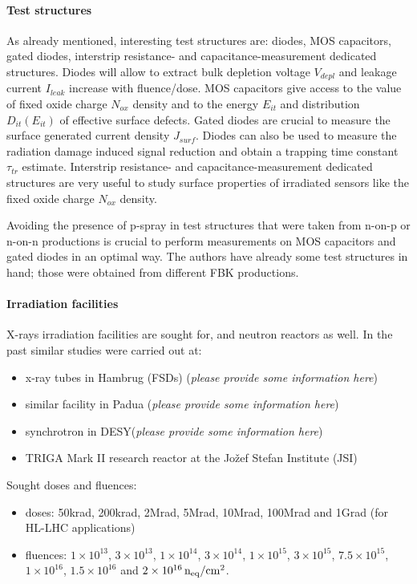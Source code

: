 \documentclass[dvips,12pt]{article}
\begin{document}
\paragraph{Test structures} As already mentioned, interesting test structures are: diodes, MOS 
capacitors, gated diodes, interstrip resistance- and 
capacitance-measurement dedicated structures.
Diodes will allow to extract bulk depletion voltage $V_{depl}$ and leakage current $I_{leak}$
 increase with fluence/dose. 
MOS capacitors give access to the value of fixed oxide charge $N_{ox}$ density and to the energy 
 $E_{it}$ and distribution  $D_{it}(E_{it})$ of effective surface defects. Gated diodes 
are crucial to measure the surface generated current density $J_{surf}$. 
Diodes can also be used to measure the radiation damage induced signal reduction and obtain 
a trapping time constant $\tau_{tr}$ estimate. Interstrip resistance- and 
capacitance-measurement dedicated structures are very useful to study surface properties 
of irradiated sensors like the fixed oxide charge $N_{ox}$ density.

\noindent Avoiding the presence of p-spray in test structures that were taken from
 n-on-p or n-on-n productions is crucial to perform measurements on MOS 
capacitors and gated diodes in an optimal way.
\noindent The authors have already some test structures in hand; those  were obtained from different 
FBK productions. 

\paragraph{Irradiation facilities}
X-rays irradiation facilities are sought for, and neutron reactors as well.
In the past similar studies were carried out at:
\begin{itemize}
\item x-ray tubes in Hambrug (FSDs) ({\it please provide some information here})
\item similar facility in Padua ({\it please provide some information here})
\item synchrotron in DESY({\it please provide some information here})
\item TRIGA Mark II research reactor at the Jo\v{z}ef Stefan Institute (JSI)  
\end{itemize}
\noindent Sought doses and fluences:
\begin{itemize}
\item doses: 50krad, 200krad, 2Mrad, 5Mrad, 10Mrad, 100Mrad and 1Grad (for HL-LHC 
applications)
\item fluences: $1\times10^{13}$,  $3\times10^{13}$, $1\times10^{14}$, $3\times10^{14}$, 
$1\times10^{15}$, $3\times10^{15}$, $7.5\times10^{15}$, $1\times10^{16}$, $1.5\times10^{16}$ and 
$2\times10^{16}\,{\rm n_{eq}/cm^2}$.
\end{itemize}
\end{document}
